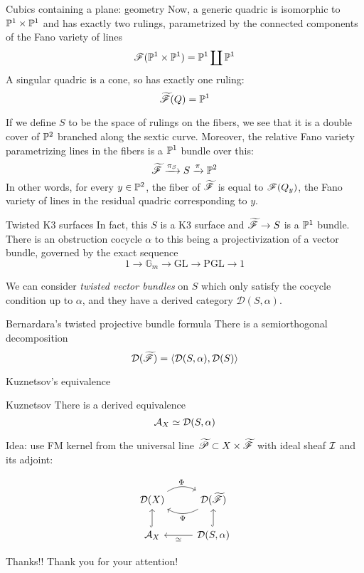 \documentclass[10pt]{beamer}
\begin{document}
\begin{frame}{Cubics containing a plane: geometry}
Now, a generic quadric is isomorphic to $\P^1 \times \P^1$ and has exactly two rulings, parametrized by the connected components of the Fano variety of lines $$\scrF(\P^1 \times \P^1)=\P^1 \coprod \P^1$$
\pause A singular quadric is a cone, so has exactly one ruling: $$\tscrF(Q)=\P^1$$ \pause

If we define $S$ to be the space of rulings on the fibers, we see that it is a double cover of $\P^2$ branched along the sextic curve. Moreover, the relative Fano variety parametrizing lines in the fibers is a $\P^1$ bundle over this: $$\tscrF \xrightarrow{\pi_S} S \xrightarrow{\pi} \P^2$$
\pause In other words, for every $y\in \P^2$, the fiber of $\tscrF$ is equal to $\scrF(Q_y)$, the Fano variety of lines in the residual quadric corresponding to $y$.
\end{frame}

\begin{frame}{Twisted K3 surfaces}
    In fact, this $S$ is a K3 surface and $\tscrF \rightarrow S$ is a $\P^1$ bundle. \pause There is an obstruction cocycle $\alpha$ to this being a projectivization of a vector bundle, governed by the exact sequence $$1\rightarrow \mathbb{G}_m\rightarrow \mathrm{GL}\rightarrow \mathrm{PGL}\rightarrow 1$$ \pause

    We can consider \emph{twisted vector bundles} on $S$ which only satisfy the cocycle condition up to $\alpha$, and they have a derived category $\mathcal{D}(S,\alpha)$. 

    \begin{colorthm}{Bernardara's twisted projective bundle formula}{}
        There is a semiorthogonal decomposition $$\calD (\tscrF)=\langle \calD(S,\alpha), \calD(S)\rangle $$
    \end{colorthm}
\end{frame}

\begin{frame}[fragile]{Kuznetsov's equivalence}
    \begin{colorthm}{Kuznetsov}{}
        There is a derived equivalence $$\calA_X\simeq \calD(S,\alpha)$$
    \end{colorthm}
    \pause
    Idea: use FM kernel from the universal line $\tscrP\subset X \times \tscrF$ with ideal sheaf $\calI$ and its adjoint: 

      \[\begin{tikzcd}
        \calD(X) \arrow[r, "\Phi", bend left] & \calD(\tscrF) \arrow[l, "\Psi", bend left]            \\
        \calA_X \arrow[u, hook]               & {\calD(S,\alpha)} \arrow[u, hook] \arrow[l, "\simeq"]
        \end{tikzcd}\]

    
\end{frame}

\begin{frame}{Thanks!!}
    Thank you for your attention!
\end{frame}










    
\end{document}
